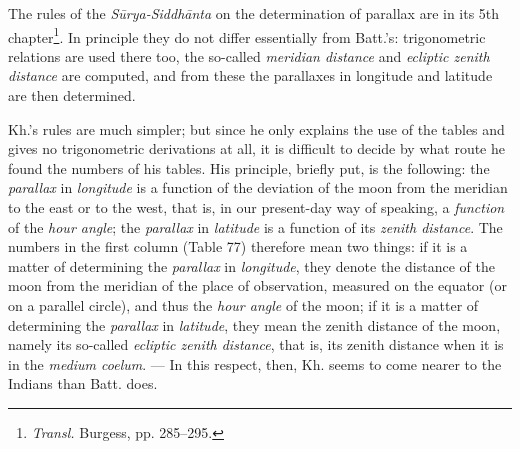 \documentclass[11pt]{article}
\begin{document}
\par The rules of the \emph{Sūrya-Siddhānta} on the determination of parallax are in its 5th chapter\footnote{\emph{Transl.} Burgess, pp. 285–295.}. In principle they do not differ essentially from Batt.'s: trigonometric relations are used there too, the so-called \emph{meridian distance} and \emph{ecliptic zenith distance} are computed, and from these the parallaxes in longitude and latitude are then determined.\par
\par Kh.'s rules are much simpler; but since he only explains the use of the tables and gives no trigonometric derivations at all, it is difficult to decide by what route he found the numbers of his tables. His principle, briefly put, is the following: the \emph{parallax} in \emph{longitude} is a function of the deviation of the moon from the meridian to the east or to the west, that is, in our present-day way of speaking, a \emph{function} of the \emph{hour angle}; the \emph{parallax} in \emph{latitude} is a function of its \emph{zenith distance}. The numbers in the first column (Table 77) therefore mean two things: if it is a matter of determining the \emph{parallax} in \emph{longitude}, they denote the distance of the moon from the meridian of the place of observation, measured on the equator (or on a parallel circle), and thus the \emph{hour angle} of the moon; if it is a matter of determining the \emph{parallax} in \emph{latitude}, they mean the zenith distance of the moon, namely its so-called \emph{ecliptic zenith distance}, that is, its zenith distance when it is in the \emph{medium coelum}. — In this respect, then, Kh. seems to come nearer to the Indians than Batt. does.\par
\end{document}
